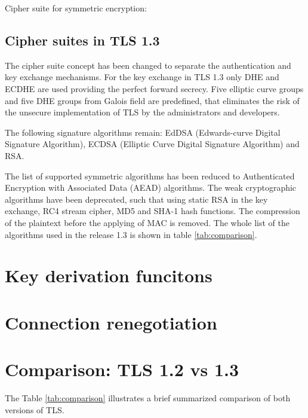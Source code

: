 Cipher suite for symmetric encryption:



\subsection{Cipher suites in TLS 1.3}
\label{subsec:ciphersuits1_3}

The cipher suite concept has been changed to separate the authentication and key exchange mechanisms.
For the key exchange in TLS 1.3 only DHE and ECDHE are used providing the perfect forward secrecy. Five elliptic curve groups and five DHE groups from Galois field are predefined, that eliminates the risk of the unsecure implementation of TLS by the administrators and developers.

The following signature algorithms remain: EdDSA (Edwards-curve Digital Signature Algorithm),
ECDSA (Elliptic Curve Digital Signature Algorithm) and RSA.

The list of supported symmetric algorithms has been reduced to Authenticated Encryption with Associated Data (AEAD) algorithms.
The weak cryptographic algorithms have been deprecated, such that using static RSA in the key exchange, RC4 stream cipher, MD5 and SHA-1 hash functions. The compression of the plaintext before the applying of MAC is removed.
The whole list of the algorithms used in the release 1.3 is shown in table \ref{tab:comparison}.
\cite{recorla}
\section{Key derivation funcitons}
\label{sec:comparison_kdf}

\section{Connection renegotiation}
\label{sec:comparison_renegotiation}

\section{Comparison: TLS 1.2 vs 1.3}
\label{sec:comparison}

The Table \ref{tab:comparison} illustrates a brief summarized comparison of both versions of TLS.

